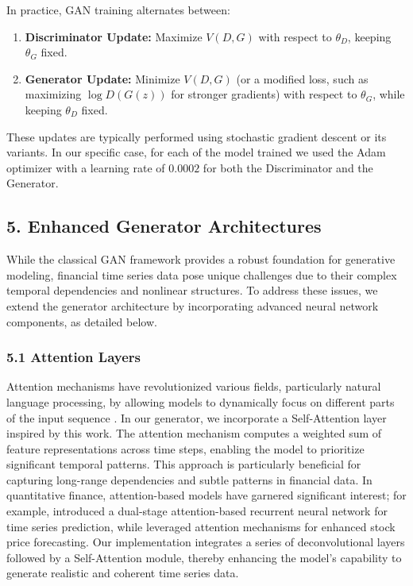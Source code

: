 \documentclass{article}
\begin{document}
In practice, GAN training alternates between:
\begin{enumerate}
    \item \textbf{Discriminator Update:} Maximize $V(D, G)$ with respect to $\theta_D$, keeping $\theta_G$ fixed.
    \item \textbf{Generator Update:} Minimize $V(D, G)$ (or a modified loss, such as maximizing $\log D(G(z))$ for stronger gradients) with respect to $\theta_G$, while keeping $\theta_D$ fixed.
\end{enumerate}
These updates are typically performed using stochastic gradient descent or its variants. In our specific case, for each of the model trained we used the Adam optimizer with a learning rate of $ 0.0002 $ for both the Discriminator and the Generator.

\subsection*{5. Enhanced Generator Architectures}

While the classical GAN framework provides a robust foundation for generative modeling, financial time series data pose unique challenges due to their complex temporal dependencies and nonlinear structures. To address these issues, we extend the generator architecture by incorporating advanced neural network components, as detailed below.

\subsubsection*{5.1 Attention Layers}

Attention mechanisms have revolutionized various fields, particularly natural language processing, by allowing models to dynamically focus on different parts of the input sequence \textcite{vaswani_attention_2023}. In our generator, we incorporate a Self-Attention layer inspired by this work. The attention mechanism computes a weighted sum of feature representations across time steps, enabling the model to prioritize significant temporal patterns. This approach is particularly beneficial for capturing long-range dependencies and subtle patterns in financial data. In quantitative finance, attention-based models have garnered significant interest; for example, \textcite{qin_dual-stage_2017} introduced a dual-stage attention-based recurrent neural network for time series prediction, while \textcite{chen_exploring_2019} leveraged attention mechanisms for enhanced stock price forecasting. Our implementation integrates a series of deconvolutional layers followed by a Self-Attention module, thereby enhancing the model's capability to generate realistic and coherent time series data.
\end{document}
